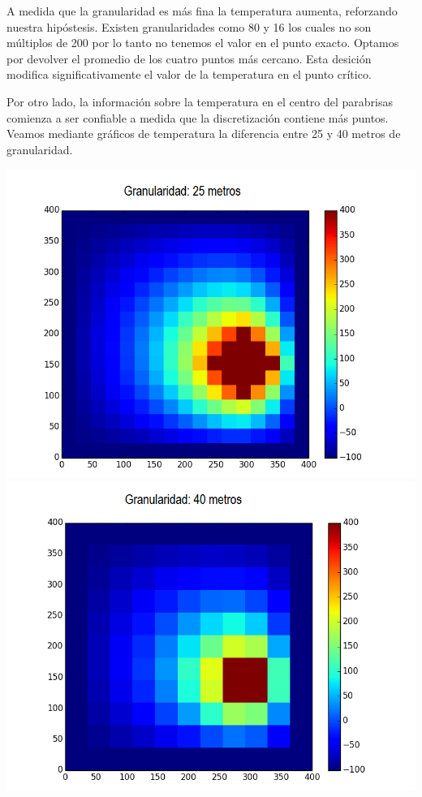 	A medida que la granularidad es más fina la temperatura aumenta, reforzando nuestra hipóstesis. Existen granularidades como 80 y 16 los cuales no son múltiplos de 200 por lo tanto no tenemos el valor en el punto exacto. Optamos por devolver el promedio de los cuatro puntos más cercano. Esta desición modifica significativamente el valor de la temperatura en el punto crítico. 

	Por otro lado, la información sobre la temperatura en el centro del parabrisas comienza a ser confiable a medida que la discretización contiene más puntos. Veamos mediante gráficos de temperatura la diferencia entre 25 y 40 metros de granularidad.

	\begin{center}
		\includegraphics[scale=0.5]{./img/temp_punto_critico/granularidad25.png}
		\includegraphics[scale=0.5]{./img/temp_punto_critico/granularidad40.png}
	\end{center}

